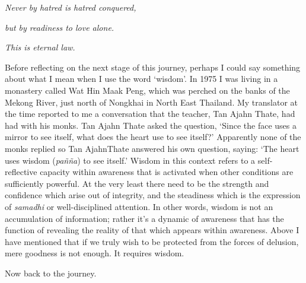 \emph{Never by hatred is hatred conquered,}

\emph{but by readiness to love alone.}

\emph{This is eternal law.}

Before reflecting on the next stage of this journey, perhaps I could say
something about what I mean when I use the word `wisdom'. In 1975 I was
living in a monastery called Wat Hin Maak Peng, which was perched on the
banks of the Mekong River, just north of Nongkhai in North East
Thailand. My translator at the time reported to me a conversation that
the teacher, Tan Ajahn Thate, had had with his monks. Tan Ajahn Thate
asked the question, `Since the face uses a mirror to see itself, what
does the heart use to see itself?' Apparently none of the monks replied
so Tan AjahnThate answered his own question, saying: `The heart uses
wisdom (\emph{pañña}) to see itself.' Wisdom in this context refers to a
self-reflective capacity within awareness that is activated when other
conditions are sufficiently powerful. At the very least there need to be
the strength and confidence which arise out of integrity, and the
steadiness which is the expression of \emph{samadhi} or well-disciplined
attention. In other words, wisdom is not an accumulation of information;
rather it's a dynamic of awareness that has the function of revealing
the reality of that which appears within awareness. Above I have
mentioned that if we truly wish to be protected from the forces of
delusion, mere goodness is not enough. It requires wisdom.

Now back to the journey.

